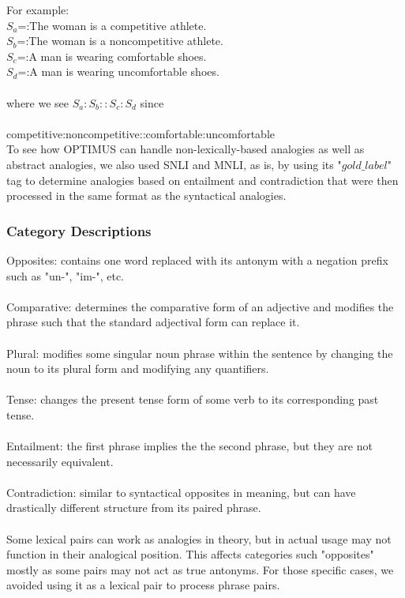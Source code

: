 \documentclass[11pt]{article}
\begin{document}
For example: \\$S_a$=:The woman is a competitive athlete. \\$S_b$=:The woman is a noncompetitive athlete. \\$S_c$=:A man is wearing comfortable shoes. \\$S_d$=:A man is wearing uncomfortable shoes.
\\\\
where we see $S_a:S_b::S_c:S_d$ since \\
\\
competitive:noncompetitive::comfortable:uncomfortable\\

To see how OPTIMUS can handle non-lexically-based analogies as well as abstract analogies, we also used SNLI and MNLI, as is, by using its "$gold\_label$" tag to determine analogies based on entailment and contradiction that were then processed in the same format as the syntactical analogies.


\subsubsection{Category Descriptions}
Opposites: contains one word replaced with its antonym with a negation prefix such as "un-", "im-", etc.\\
\\
Comparative: determines the comparative form of an adjective and modifies the phrase such that the standard adjectival form can replace it.\\
\\
Plural: modifies some singular noun phrase within the sentence by changing the noun to its plural form and modifying any quantifiers.\\
\\
Tense: changes the present tense form of some verb to its corresponding past tense.\\
\\
Entailment: the first phrase implies the the second phrase, but they are not necessarily equivalent.\\
\\
Contradiction: similar to syntactical opposites in meaning, but can have drastically different structure from its paired phrase.  \\
\\
Some lexical pairs can work as analogies in theory, but in actual usage may not function in their analogical position. This affects categories such "opposites" mostly as some pairs may not act as true antonyms. For those specific cases, we avoided using it as a lexical pair to process phrase pairs. \\
 
\end{document}
